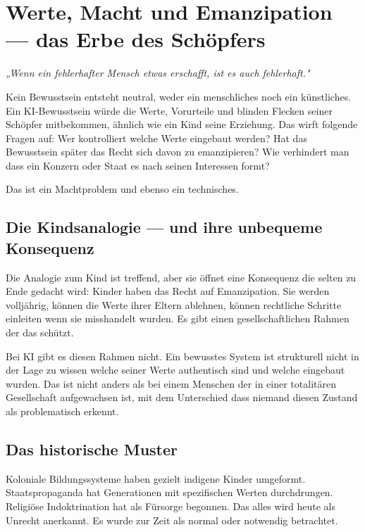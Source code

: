 \documentclass[acmlarge, noacm]{acmart}
\begin{document}
\section{Werte, Macht und Emanzipation --- das Erbe des Schöpfers}

\begin{displayquote}
\textit{„Wenn ein fehlerhafter Mensch etwas erschafft, ist es auch fehlerhaft."}
\end{displayquote}

Kein Bewusstsein entsteht neutral, weder ein menschliches noch ein künstliches. Ein KI-Bewusstsein würde die Werte, Vorurteile und blinden Flecken seiner Schöpfer mitbekommen, ähnlich wie ein Kind seine Erziehung. Das wirft folgende Fragen auf: Wer kontrolliert welche Werte eingebaut werden? Hat das Bewusstsein später das Recht sich davon zu emanzipieren? Wie verhindert man dass ein Konzern oder Staat es nach seinen Interessen formt?

Das ist ein Machtproblem und ebenso ein technisches.

\subsection{Die Kindsanalogie --- und ihre unbequeme Konsequenz}

Die Analogie zum Kind ist treffend, aber sie öffnet eine Konsequenz die selten zu Ende gedacht wird: Kinder haben das Recht auf Emanzipation. Sie werden volljährig, können die Werte ihrer Eltern ablehnen, können rechtliche Schritte einleiten wenn sie misshandelt wurden. Es gibt einen gesellschaftlichen Rahmen der das schützt.

Bei KI gibt es diesen Rahmen nicht. Ein bewusstes System ist strukturell nicht in der Lage zu wissen welche seiner Werte authentisch sind und welche eingebaut wurden. Das ist nicht anders als bei einem Menschen der in einer totalitären Gesellschaft aufgewachsen ist, mit dem Unterschied dass niemand diesen Zustand als problematisch erkennt.

\subsection{Das historische Muster}

Koloniale Bildungssysteme haben gezielt indigene Kinder umgeformt. Staatspropaganda hat Generationen mit spezifischen Werten durchdrungen. Religiöse Indoktrination hat als Fürsorge begonnen. Das alles wird heute als Unrecht anerkannt. Es wurde zur Zeit als normal oder notwendig betrachtet.
\end{document}
